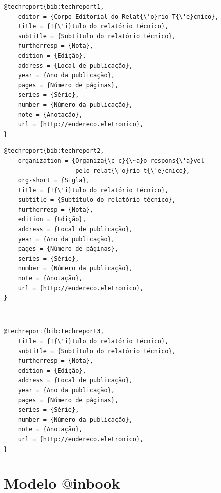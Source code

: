 \documentclass[a4paper,12pt,oneside,onecolumn,final,fleqn]{repUERJ}
\begin{document}
\noindent{}

\begin{verbatim}
@techreport{bib:techreport1,
    editor = {Corpo Editorial do Relat{\'o}rio T{\'e}cnico},
    title = {T{\'i}tulo do relatório técnico},
    subtitle = {Subtítulo do relatório técnico},
    furtherresp = {Nota},
    edition = {Edição},
    address = {Local de publicação},
    year = {Ano da publicação},
    pages = {Número de páginas},
    series = {Série},
    number = {Número da publicação},
    note = {Anotação},
    url = {http://endereco.eletronico},
}
\end{verbatim}

\noindent{}

\begin{verbatim}
@techreport{bib:techreport2,
    organization = {Organiza{\c c}{\~a}o respons{\'a}vel 
    				pelo relat{\'o}rio t{\'e}cnico},
    org-short = {Sigla},
    title = {T{\'i}tulo do relatório técnico},
    subtitle = {Subtítulo do relatório técnico},
    furtherresp = {Nota},
    edition = {Edição},
    address = {Local de publicação},
    year = {Ano da publicação},
    pages = {Número de páginas},
    series = {Série},
    number = {Número da publicação},
    note = {Anotação},
    url = {http://endereco.eletronico},
}
\end{verbatim}

\noindent{}\\

\begin{verbatim}
@techreport{bib:techreport3,
    title = {T{\'i}tulo do relatório técnico},
    subtitle = {Subtítulo do relatório técnico},
    furtherresp = {Nota},
    edition = {Edição},
    address = {Local de publicação},
    year = {Ano da publicação},
    pages = {Número de páginas},
    series = {Série},
    number = {Número da publicação},
    note = {Anotação},
    url = {http://endereco.eletronico},
}
\end{verbatim}

\section{Modelo $@$inbook}

\noindent{}
\end{document}
